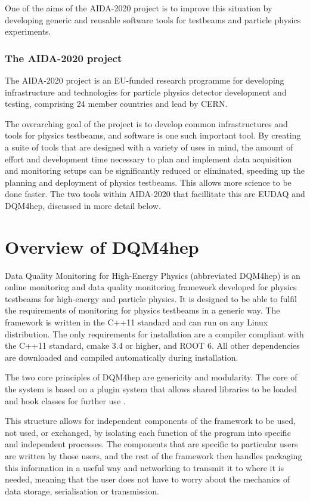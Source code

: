 One of the aims of the AIDA-2020 project is to improve this situation by developing generic and reusable software tools for testbeams and particle physics experiments.

\subsubsection{The AIDA-2020 project}
The AIDA-2020 project is an EU-funded research programme for developing infrastructure and technologies for particle physics detector development and testing, comprising 24 member countries and lead by CERN.

The overarching goal of the project is to develop common infrastructures and tools for physics testbeams, and software is one such important tool. By creating a suite of tools that are designed with a variety of uses in mind, the amount of effort and development time necessary to plan and implement data acquisition and monitoring setups can be significantly reduced or eliminated, speeding up the planning and deployment of physics testbeams. This allows more science to be done faster. The two tools within AIDA-2020 that facillitate this are EUDAQ and DQM4hep, discussed in more detail below.

\section{Overview of DQM4hep}
Data Quality Monitoring for High-Energy Physics (abbreviated DQM4hep) is an online monitoring and data quality monitoring framework developed for physics testbeams for high-energy and particle physics. It is designed to be able to fulfil the requirements of monitoring for physics testbeams in a generic way. The framework is written in the C++11 standard and can run on any Linux distribution. The only requirements for installation are a compiler compliant with the C++11 standard, cmake 3.4 or higher, and ROOT 6. All other dependencies are downloaded and compiled automatically during installation. 

The two core principles of DQM4hep are genericity and modularity. The core of the system is based on a plugin system that allows shared libraries to be loaded and hook classes for further use \cite{aida2020-milestone-dqm4hep}. 

This structure allows for independent components of the framework to be used, not used, or exchanged, by isolating each function of the program into specific and independent processes. The components that are specific to particular users are written by those users, and the rest of the framework then handles packaging this information in a useful way and networking to transmit it to where it is needed, meaning that the user does not have to worry about the mechanics of data storage, serialisation or transmission. 

